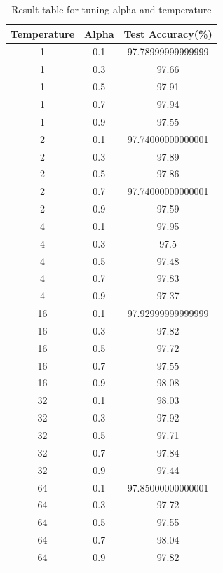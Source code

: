 \documentclass[conference]{IEEEtran}
\begin{document}
  \begin{table}[h]
  \centering
      \begin{tabular}{|c|c|c|}
      \hline
      Temperature & Alpha & Test Accuracy(\%)      \\ \hline
      1           & 0.1   & 97.78999999999999  \\ \hline
      1           & 0.3   & 97.66 \\ \hline
      1           & 0.5   & 97.91   \\ \hline
      1           & 0.7   & 97.94 \\ \hline
      1           & 0.9   & 97.55  \\ \hline
      2           & 0.1   & 97.74000000000001 \\ \hline
      2           & 0.3   & 97.89 \\ \hline
      2           & 0.5   & 97.86 \\ \hline
      2           & 0.7   & 97.74000000000001  \\ \hline
      2           & 0.9   & 97.59  \\ \hline
      4           & 0.1   & 97.95 \\ \hline
      4           & 0.3   & 97.5 \\ \hline
      4           & 0.5   & 97.48 \\ \hline
      4           & 0.7   & 97.83  \\ \hline
      4           & 0.9   & 97.37 \\ \hline
      16          & 0.1   & 97.92999999999999 \\ \hline
      16          & 0.3   & 97.82 \\ \hline
      16          & 0.5   & 97.72  \\ \hline
      16          & 0.7   & 97.55 \\ \hline
      16          & 0.9   & 98.08  \\ \hline
      32          & 0.1   & 98.03 \\ \hline
      32          & 0.3   & 97.92  \\ \hline
      32          & 0.5   & 97.71 \\ \hline
      32          & 0.7   & 97.84 \\ \hline
      32          & 0.9   & 97.44   \\ \hline
      64          & 0.1   & 97.85000000000001 \\ \hline
      64          & 0.3   & 97.72 \\ \hline
      64          & 0.5   & 97.55 \\ \hline
      64          & 0.7   & 98.04 \\ \hline
      64          & 0.9   & 97.82  \\ \hline
      \end{tabular}
      \caption{Result table for tuning alpha and temperature}
  \end{table}\par
\end{document}
